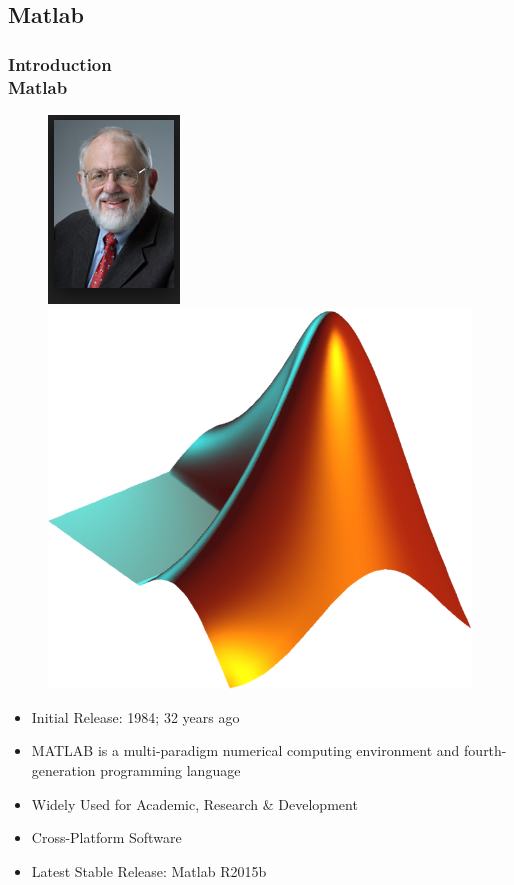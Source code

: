 \documentclass[hyperref={pdfpagelabels=true}]{beamer}
\begin{document}
\subsection{Matlab}
\begin{frame}
\frametitle{Introduction\\ {\large Matlab}}
\begin{figure}[!tbp]
\centering
\includegraphics[scale = 0.5]{figs/matl.png}
\includegraphics[scale = 0.08]{figs/Selection_035.png}
\end{figure}
\small{
\begin{itemize}
\item Initial Release: 1984; 32 years ago
\item MATLAB is a multi-paradigm numerical computing environment and fourth-generation programming language
\item Widely Used for Academic, Research \& Development
\item Cross-Platform Software
\item Latest Stable Release: Matlab R2015b
\end{itemize}}
\end{frame}
\end{document}
